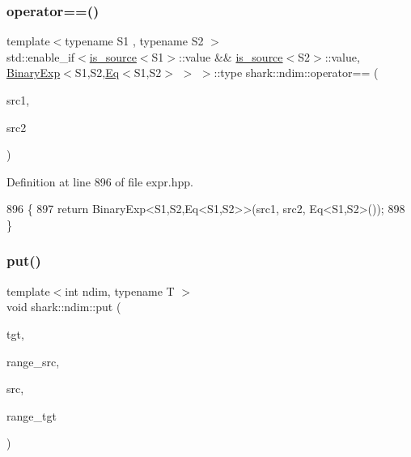 \subsubsection{\texorpdfstring{operator==()}{operator==()}}
{\footnotesize\ttfamily template$<$typename S1 , typename S2 $>$ \\
std\+::enable\+\_\+if$<$\hyperlink{classshark_1_1ndim_1_1is__source}{is\+\_\+source}$<$S1$>$\+::value \&\& \hyperlink{classshark_1_1ndim_1_1is__source}{is\+\_\+source}$<$S2$>$\+::value, \hyperlink{classshark_1_1ndim_1_1_binary_exp}{Binary\+Exp}$<$S1,S2,\hyperlink{classshark_1_1ndim_1_1_eq}{Eq}$<$S1,S2$>$ $>$ $>$\+::type shark\+::ndim\+::operator== (\begin{DoxyParamCaption}\item[{const S1 \&}]{src1,  }\item[{const S2 \&}]{src2 }\end{DoxyParamCaption})}



Definition at line 896 of file expr.\+hpp.


\begin{DoxyCode}
896                                                                                                            
                                              \{
897             \textcolor{keywordflow}{return} BinaryExp<S1,S2,Eq<S1,S2>>(src1, src2, Eq<S1,S2>());
898         \}
\end{DoxyCode}
\hypertarget{namespaceshark_1_1ndim_afb46dbb15b06e4fc1fe871b457cc0695}{}\label{namespaceshark_1_1ndim_afb46dbb15b06e4fc1fe871b457cc0695} 
\subsubsection{\texorpdfstring{put()}{put()}}
{\footnotesize\ttfamily template$<$int ndim, typename T $>$ \\
void shark\+::ndim\+::put (\begin{DoxyParamCaption}\item[{\hyperlink{classshark_1_1ndim_1_1_global_array}{Global\+Array}$<$ ndim, T $>$ \&}]{tgt,  }\item[{\hyperlink{structshark_1_1ndim_1_1coords__range}{coords\+\_\+range}$<$ ndim $>$}]{range\+\_\+src,  }\item[{\hyperlink{classshark_1_1ndim_1_1_global_array}{Global\+Array}$<$ ndim, T $>$ \&}]{src,  }\item[{\hyperlink{structshark_1_1ndim_1_1coords__range}{coords\+\_\+range}$<$ ndim $>$}]{range\+\_\+tgt }\end{DoxyParamCaption})}



